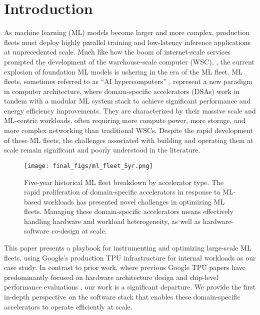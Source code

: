 \section{Introduction}\label{sec:intro}








As machine learning (ML) models become larger and more complex, production fleets must deploy highly parallel training \cite{vaswani2017attention} and low-latency inference \cite{pope2023efficiently} applications at unprecedented scale. Much like how the boom of internet-scale services \cite{hamilton2007iss} prompted the development of the warehouse-scale computer (WSC), \citep{barroso2009wsc,kanev2015profiling}, the current explosion of foundation ML models \citep{geminiteam2024geminifamilyhighlycapable,brown2020languagemodelsfewshotlearners,anthropic2024claude} is ushering in the era of the ML fleet. ML fleets, sometimes referred to as ``AI hypercomputers'' \cite{aihypercomputer}, represent a new paradigm in computer architecture, where domain-specific accelerators (DSAs) work in tandem with a modular ML system stack to achieve significant performance and energy efficiency improvements. They are characterized by their massive scale and ML-centric workloads, often requiring more compute power, more storage, and more complex networking than traditional WSCs.  Despite the rapid development of these ML fleets, the challenges associated with building and operating them at scale remain significant and poorly understood in the literature.





\begin{figure}[t]
    \centering
    \texttt{[image: final\_figs/ml\_fleet\_5yr.png]}
    \caption{Five-year historical ML fleet breakdown by accelerator type. The rapid proliferation of domain-specific accelerators in response to ML-based workloads has presented novel challenges in optimizing ML fleets. Managing these domain-specific accelerators means effectively handling hardware and workload heterogeneity, as well as hardware-software co-design at scale.}
    \vspace*{-2em}
    \label{fig:five-years}
\end{figure}

This paper presents a playbook for instrumenting and optimizing large-scale ML fleets, using Google's production TPU infrastructure for internal workloads as our case study. In contrast to prior work, where previous Google TPU papers have predominantly focused on hardware architecture design and chip-level performance evaluations \citep{jouppi2023tpuv4opticallyreconfigurable, jouppi2021ten, jouppi2017indatacenter}, our work is a significant departure. We provide the first in-depth perspective on the software stack that enables these domain-specific accelerators to operate efficiently at scale. 


